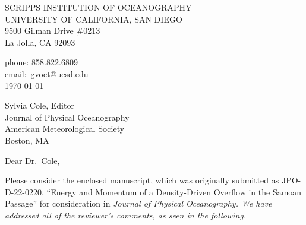 \documentclass[11pt]{article}
\begin{document}
\pagestyle{empty}

\begin{center}
{\large  SCRIPPS INSTITUTION OF OCEANOGRAPHY\\
UNIVERSITY OF CALIFORNIA, SAN DIEGO}\\
\vspace{0.1in}
{\small 9500 Gilman Drive \#0213\\
La Jolla, CA 92093}
\end{center}

\begin{flushright}
phone: 858.822.6809\\
email:~gvoet@ucsd.edu\\
\vspace{0.2in}
\today
\end{flushright}

\begin{flushleft}
Sylvia Cole, Editor\\
Journal of Physical Oceanography\\
American Meteorological Society\\
Boston, MA\\

\end{flushleft}

\vspace{.2in}

\noindent Dear Dr.\ Cole,

Please consider the enclosed manuscript, which was originally submitted as JPO-D-22-0220, ``Energy and Momentum of a Density-Driven Overflow in the Samoan Passage'' for consideration in \it Journal of Physical Oceanography\rm.  We have addressed all of the reviewer's comments, as seen in the following.
\end{document}
